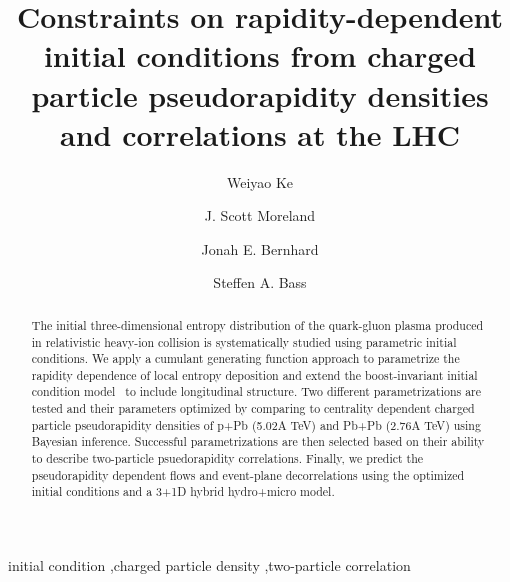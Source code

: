 \documentclass[3p,times,twocolumn]{elsarticle}
\begin{document}
\begin{frontmatter}



\dochead{}

\title{Constraints on rapidity-dependent initial conditions from charged particle pseudorapidity densities and correlations at the LHC}


\author{Weiyao Ke}
\author{J. Scott Moreland}
\author{Jonah E. Bernhard}
\author{Steffen A. Bass}

\address{Department of Physics, Duke University, Durham, NC 27708-0305, United States}

\begin{abstract}
The initial three-dimensional entropy distribution of the quark-gluon plasma produced in relativistic heavy-ion collision is systematically studied using parametric initial conditions.
We apply a cumulant generating function approach to parametrize the rapidity dependence of local entropy deposition and extend the boost-invariant initial condition model \trento~to include longitudinal structure.
Two different parametrizations are tested and their parameters optimized by comparing to centrality dependent charged particle pseudorapidity densities of p+Pb (5.02A TeV) and Pb+Pb (2.76A TeV) using Bayesian inference.
Successful parametrizations are then selected based on their ability to describe two-particle psuedorapidity correlations.
Finally, we predict the pseudorapidity dependent flows and event-plane decorrelations using the optimized initial conditions and a 3+1D hybrid hydro+micro model.

\end{abstract}

\begin{keyword}
initial condition \sep charged particle density \sep two-particle correlation


\end{keyword}

\end{frontmatter}
\end{document}
